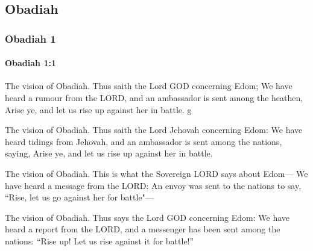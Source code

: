 \subsection{Obadiah}
	\label{OBADIAH}

	\subsubsection{Obadiah 1} %
		\label{OBADIAH-1}
		
		\hyperref[CHESED]{}

		\paragraph{Obadiah 1:1} %
			\label{OBADIAH-1-1}

			The vision of Obadiah. Thus saith the Lord GOD concerning Edom; We have heard a rumour from the LORD, and an ambassador is sent among the heathen, Arise ye, and let us rise up against her in battle.
g
			\begin{versebox}
					\item[BHS] 
					\item[LXX] 
					\item[ASV] The vision of Obadiah. Thus saith the Lord Jehovah concerning Edom: We have heard tidings from Jehovah, and an ambassador is sent among the nations, saying, Arise ye, and let us rise up against her in battle.
					\item[NIV] The vision of Obadiah. This is what the Sovereign LORD says about Edom— We have heard a message from the LORD: An envoy was sent to the nations to say, “Rise, let us go against her for battle"—
					\item[NRSV] The vision of Obadiah. Thus says the Lord GOD concerning Edom: We have heard a report from the LORD, and a messenger has been sent among the nations: “Rise up! Let us rise against it for battle!”
			\end{versebox}


